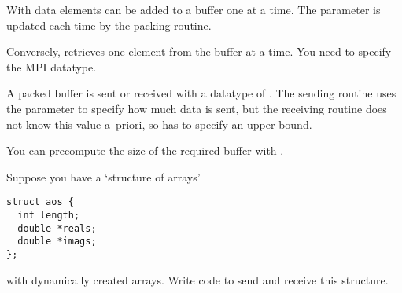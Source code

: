 With  data elements can be added 
to a buffer one at a time. The  parameter is updated
each time by the packing routine.

Conversely,  retrieves one element
from the buffer at a time. You need to specify the MPI datatype.

A packed buffer is sent or received with a datatype of
. The sending routine uses the 
parameter to specify how much data is sent, but the receiving routine
does not know this value a~priori, so has to specify an upper bound.


You can precompute the size of the required buffer with
%
.
%

\begin{exercise}
  \label{ex:packAOS}
  Suppose you have a `structure of arrays'
\begin{lstlisting}
struct aos {
  int length;
  double *reals;
  double *imags;
};
\end{lstlisting}
  with dynamically created arrays. Write code to send and receive this
  structure.
\end{exercise}
